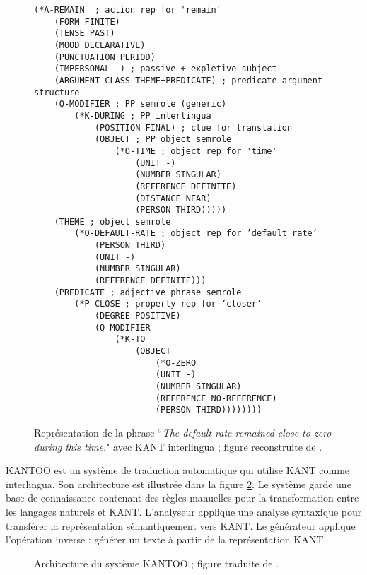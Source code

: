 \documentclass{KodeBook}
\begin{document}
\begin{figure}[ht]
	\centering
\begin{multicols}{2}
\bfseries\tiny
\begin{verbatim}
(*A-REMAIN  ; action rep for 'remain'
    (FORM FINITE)
    (TENSE PAST)
    (MOOD DECLARATIVE)
    (PUNCTUATION PERIOD)
    (IMPERSONAL -) ; passive + expletive subject
    (ARGUMENT-CLASS THEME+PREDICATE) ; predicate argument structure
    (Q-MODIFIER ; PP semrole (generic)
        (*K-DURING ; PP interlingua
            (POSITION FINAL) ; clue for translation
 		    (OBJECT ; PP object semrole
 		        (*O-TIME ; object rep for 'time'
 		            (UNIT -)
 		            (NUMBER SINGULAR)
 		            (REFERENCE DEFINITE)
 		            (DISTANCE NEAR)
 		            (PERSON THIRD)))))
    (THEME ; object semrole
        (*O-DEFAULT-RATE ; object rep for ’default rate’
            (PERSON THIRD)
            (UNIT -)
            (NUMBER SINGULAR)
            (REFERENCE DEFINITE)))
    (PREDICATE ; adjective phrase semrole
        (*P-CLOSE ; property rep for ’closer’
            (DEGREE POSITIVE)
            (Q-MODIFIER
                (*K-TO
                    (OBJECT
                        (*O-ZERO
                        (UNIT -)
                        (NUMBER SINGULAR)
                        (REFERENCE NO-REFERENCE)
                        (PERSON THIRD))))))))
\end{verbatim}
\end{multicols}
	\caption[Exemple de la représentation KANT]{Représentation de la phrase ``\textit{The default rate remained close to zero during this time.}" avec KANT interlingua ; figure reconstruite de \cite{98-czuba-al}.}
	\label{fig:kant-exp}
\end{figure}

KANTOO \cite{00-nyberg-al} est un système de traduction automatique qui utilise KANT comme interlingua.
Son architecture est illustrée dans la figure \ref{fig:mt-kantoo-arch}.
Le système garde une base de connaissance contenant des règles manuelles pour la transformation entre les langages naturels et KANT. 
L'analyseur applique une analyse syntaxique pour transférer la représentation sémantiquement vers KANT. 
Le générateur applique l'opération inverse : générer un texte à partir de la représentation KANT.

\begin{figure}[ht]
	\centering
	\caption[Architecture du système KANTOO]{Architecture du système KANTOO ; figure traduite de \cite{00-nyberg-al}.}
	\label{fig:mt-kantoo-arch}
\end{figure}
\end{document}
